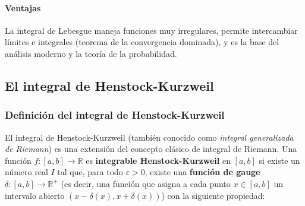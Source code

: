 \documentclass[12pt, a4paper]{article}
\theoremstyle{rioplatense}
\begin{document}
\paragraph{Ventajas}
La integral de Lebesgue maneja funciones muy irregulares, permite intercambiar límites e integrales (teorema de la convergencia dominada), y es la base del análisis moderno y la teoría de la probabilidad.


\subsection{El integral de Henstock-Kurzweil} %

\subsubsection{Definición del integral de Henstock-Kurzweil}
El integral de Henstock-Kurzweil (también conocido como \textit{integral generalizada de Riemann}) es una extensión del concepto clásico de integral de Riemann. Una función $f: [a,b] \to \mathbb{R}$ es \textbf{integrable Henstock-Kurzweil} en $[a,b]$ si existe un número real $I$ tal que, para todo $\varepsilon > 0$, existe una \textbf{función de gauge} $\delta: [a,b] \to \mathbb{R}^+$ (es decir, una función que asigna a cada punto $x \in [a,b]$ un intervalo abierto $(x-\delta(x), x+\delta(x))$) con la siguiente propiedad:
\end{document}

